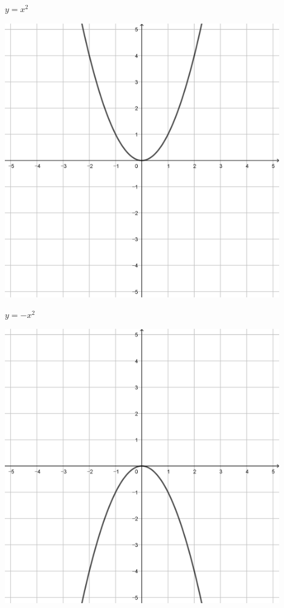 \documentclass[a4paper]{oblivoir}
\begin{document}
\begin{minipage}{0.45\textwidth}\centering
\(y=x^2\)
\par\bigskip\includegraphics[width=0.9\textwidth]{img/2_quadratic_1}
\end{minipage}
\begin{minipage}{0.45\textwidth}\centering
\(y=-x^2\)
\par\bigskip\includegraphics[width=0.9\textwidth]{img/2_quadratic_2}
\end{minipage}\bigskip\bigskip\par
\end{document}
